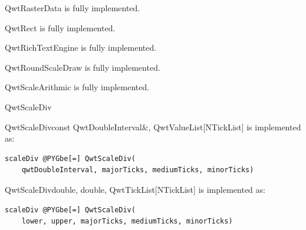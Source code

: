 \documentclass[a4paper,10pt,english]{manual}
\begin{document}
\hypertarget{PyQt4.Qwt5.QwtRasterData}{}\begin{classdesc}{QwtRasterData}{}
is fully implemented.
\end{classdesc}

\hypertarget{PyQt4.Qwt5.QwtRect}{}\begin{classdesc}{QwtRect}{}
is fully implemented.
\end{classdesc}

\hypertarget{PyQt4.Qwt5.QwtRichTextEngine}{}\begin{classdesc}{QwtRichTextEngine}{}
is fully implemented.
\end{classdesc}

\hypertarget{PyQt4.Qwt5.QwtRoundScaleDraw}{}\begin{classdesc}{QwtRoundScaleDraw}{}
is fully implemented.
\end{classdesc}

\hypertarget{PyQt4.Qwt5.QwtScaleArithmic}{}\begin{classdesc}{QwtScaleArithmic}{}
is fully implemented.
\end{classdesc}

\hypertarget{PyQt4.Qwt5.QwtScaleDiv}{}\begin{classdesc}{QwtScaleDiv}{}~

\hypertarget{QwtScaleDiv}{}\begin{cfuncdesc}{}{QwtScaleDiv}{const QwtDoubleInterval\&, QwtValueList{[}NTickList{]}}
is implemented as:

\begin{Verbatim}[commandchars=@\[\]]
scaleDiv @PYGbe[=] QwtScaleDiv(
    qwtDoubleInterval, majorTicks, mediumTicks, minorTicks)
\end{Verbatim}
\end{cfuncdesc}

\begin{cfuncdesc}{}{QwtScaleDiv}{double, double, QwtTickList{[}NTickList{]}}
is implemented as:

\begin{Verbatim}[commandchars=@\[\]]
scaleDiv @PYGbe[=] QwtScaleDiv(
    lower, upper, majorTicks, mediumTicks, minorTicks)
\end{Verbatim}
\end{cfuncdesc}
\end{classdesc}
\end{document}
